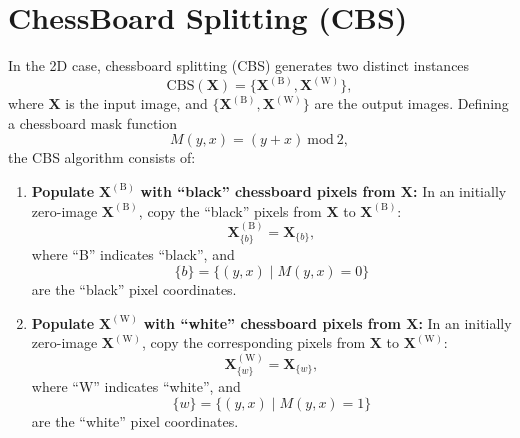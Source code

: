 \documentclass{article}
\begin{document}

\section{ChessBoard Splitting (CBS)}
\label{ape:CBS}

In the 2D case, chessboard splitting (CBS) generates two distinct
instances
\begin{equation}
  \mathrm{CBS}(\mathbf{X})=\{\mathbf{X}^{(\text{B})},\mathbf{X}^{(\text{W})}\},
\end{equation}
where $\mathbf{X}$ is the input image, and
$\{\mathbf{X}^{(\text{B})},\mathbf{X}^{(\text{W})}\}$ are the output
images. Defining a chessboard mask function
\begin{equation}
  M(y,x)=(y+x)~\text{mod}~2,
\end{equation}
the CBS algorithm consists of:
\begin{enumerate}
\item \textbf{Populate} $\mathbf{X}^{(\text{B})}$ \textbf{with
    ``black'' chessboard pixels from $\mathbf{X}$:} In an initially
  zero-image $\mathbf{X}^{(\text{B})}$, copy the ``black'' pixels from
  $\mathbf{X}$ to $\mathbf{X}^{(\text{B})}$:
  \begin{equation}
    \mathbf{X}^{(\text{B})}_{\{b\}} = \mathbf{X}_{\{b\}},
    \label{eq:copy_blacks}
  \end{equation}
  where ``B'' indicates ``black'', and
  \begin{equation}
    \{b\} = \{(y, x) \mid M(y, x)=0\}
    \label{eq:black_pixels}
  \end{equation}
  are the ``black'' pixel coordinates.
  
\item \textbf{Populate} $\mathbf{X}^{(\text{W})}$ \textbf{with
    ``white'' chessboard pixels from $\mathbf{X}$:} In an initially
  zero-image $\mathbf{X}^{(\text{W})}$, copy the corresponding pixels
  from $\mathbf{X}$ to $\mathbf{X}^{(\text{W})}$:
  \begin{equation}
    \mathbf{X}^{(\text{W})}_{\{w\}} = \mathbf{X}_{\{w\}},
    \label{eq:copy_whites}
  \end{equation}
  where ``W'' indicates ``white'', and
  \begin{equation}
    \{w\} = \{(y, x) \mid M(y, x)=1\}
    \label{eq:white_pixels}
  \end{equation}
  are the ``white'' pixel coordinates.
  
\end{enumerate}
\end{document}
